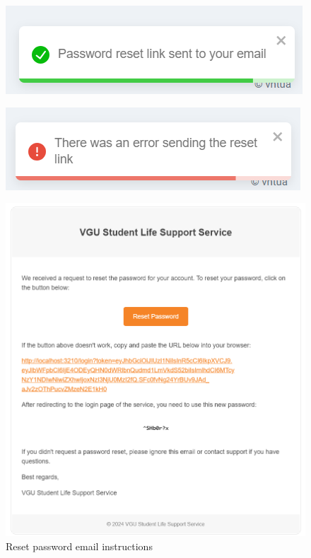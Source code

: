 \begin{figure}[H]
	\centering
	\begin{minipage}{.5\textwidth}
		\centering
		\includegraphics[width=.9\linewidth]{graphics/gui/user/reset-pass-success.png}
		\label{fig:gui-reset-pass-success}
	\end{minipage}%
	\begin{minipage}{.5\textwidth}
		\centering
		\includegraphics[width=0.9\linewidth]{graphics/gui/user/reset-pass-failed.png}
		\label{fig:gui-reset-pass-failed}
	\end{minipage}
\end{figure}


\begin{figure}[H]
	\centering
	\includegraphics[width=0.8\linewidth]{graphics/gui/user/email-reset.png}
	\caption{Reset password email instructions}
	\label{fig:gui-email-reset-pass}
\end{figure}


